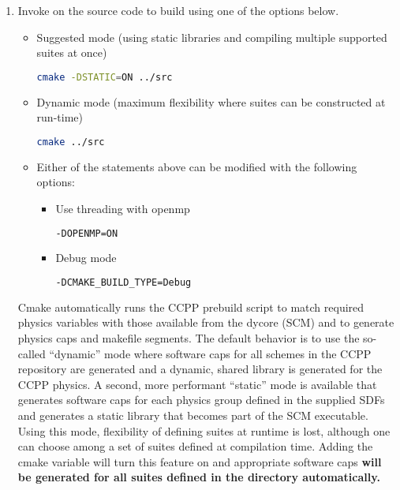 \begin{enumerate}
 \item Invoke  on the source code to build using one of the options below.
\begin{itemize}
\item Suggested mode (using static libraries and compiling multiple supported suites at once)
\begin{lstlisting}[language=bash]
cmake -DSTATIC=ON ../src
\end{lstlisting}
\item Dynamic mode (maximum flexibility where suites can be constructed at run-time)
\begin{lstlisting}[language=bash]
cmake ../src
\end{lstlisting}
\item Either of the statements above can be modified with the following options:
\begin{itemize}
\item Use threading with openmp
\begin{lstlisting}[language=bash]
-DOPENMP=ON
\end{lstlisting}
\item Debug mode
\begin{lstlisting}[language=bash]
-DCMAKE_BUILD_TYPE=Debug
\end{lstlisting}
\end{itemize}
\end{itemize}

Cmake automatically runs the CCPP prebuild script to match required physics variables with those available from the dycore (SCM) and to generate physics caps and makefile segments. The default behavior is to use the so-called ``dynamic'' mode where software caps for all schemes in the CCPP repository are generated and a dynamic, shared library is generated for the CCPP physics. A second, more performant ``static'' mode is available that generates software caps for each physics group defined in the supplied SDFs and generates a static library that becomes part of the SCM executable. Using this mode, flexibility of defining suites at runtime is lost, although one can choose among a set of suites defined at compilation time. Adding the cmake variable  will turn this feature on and appropriate software caps \textbf{will be generated for all suites defined in the  directory automatically.}


\end{enumerate}
